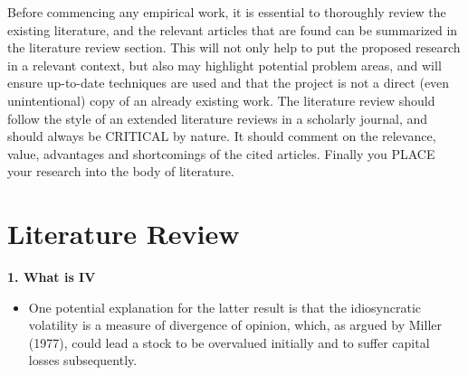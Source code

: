 Before commencing any empirical work, it is essential to thoroughly review the existing literature, and the relevant articles that are found can be summarized in the literature review section. This will not only help to put the proposed research in a relevant context, but also may highlight potential problem areas, and will ensure up-to-date techniques are used and that the project is not a direct (even unintentional) copy of an already existing work. The literature review should follow the style of an extended literature reviews in a scholarly journal, and should always be CRITICAL by nature. It should comment on the relevance, value, advantages and shortcomings of the cited articles. Finally you PLACE your research into the body of literature.


\chapter{Literature Review}

\textbf{1. What is IV}
\begin{itemize}
    \item One potential explanation for the latter result is that the idiosyncratic volatility is a measure of divergence of opinion, which, as argued by Miller (1977), could lead a stock to be overvalued initially and to suffer capital losses subsequently.
\end{itemize}

